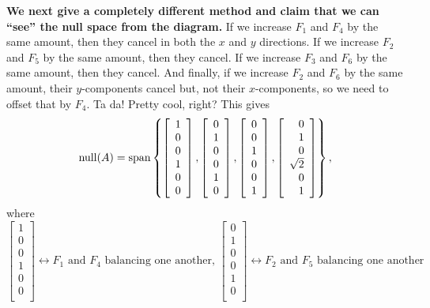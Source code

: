 \textbf{We next give a completely different method and claim that we can ``see'' the null space from the diagram.} If we increase $F_1$ and $F_4$ by the same amount, then they cancel in both the $x$ and $y$ directions. If we increase  $F_2$ and $F_5$ by the same amount, then they cancel.  If we increase $F_3$ and $F_6$ by the same amount, then they cancel. And finally, if we increase  $F_2$ and $F_6$ by the same amount, their $y$-components cancel but, not their $x$-components, so we need to offset that by $F_4$. Ta da! Pretty cool, right? This gives
\begin{equation}
    \label{eq:HandComputeNullSpace}
    \mathrm{null}(A)={\rm span}\left\{ \left[\begin{array}{c} 1\\0 \\  0\\1 \\ 0\\0 \\ \end{array} \right],
\left[\begin{array}{c} 0\\1\\  0\\0 \\ 1\\0 \\ \end{array} \right],
\left[\begin{array}{c} 0\\0 \\  1\\0 \\ 0\\1 \\ \end{array} \right],
\left[\begin{array}{r} 0\\1 \\  0\\ \sqrt{2} \\ 0\\1 \\ \end{array} \right]
    \right\},
\end{equation}
where
$$\left[\begin{array}{c} 1\\0 \\  0\\1 \\ 0\\0 \\ \end{array} \right] \leftrightarrow F_1 \text{ and } F_4 \text{ balancing one another, }
\left[\begin{array}{c} 0\\1\\  0\\0 \\ 1\\0 \\ \end{array} \right] \leftrightarrow F_2 \text{ and } F_5 \text{ balancing one another }$$

